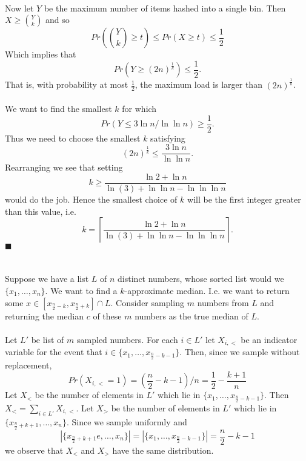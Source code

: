 \documentclass[letterpaper,12pt,oneside,onecolumn]{article}
\newcommand{\ceil}[1]{\ensuremath{\left\lceil#1\right\rceil}}
\begin{document}
\paragraph{}
Now let $Y$ be the maximum number of items hashed into a single bin. Then $X \geq {Y \choose k}$ and so
$$Pr({Y\choose k}\geq t) \leq Pr(X \geq t) \leq \frac{1}{2}$$
Which implies that 
$$Pr(Y \geq (2n)^{\frac{1}{k}}) \leq \frac{1}{2}.$$
That is, with probability at most $\frac{1}{2}$, the maximum load is larger than $(2n)^{\frac{1}{k}}$. 
\paragraph{}
We want to find the smallest $k$ for which 
$$Pr(Y \leq 3\ln n / \ln \ln n) \geq \frac{1}{2}.$$
Thus we need to choose the smallest $k$ satisfying
$$(2n)^{\frac{1}{k}} \leq \frac{3\ln n}{\ln \ln n}.$$
Rearranging we see that setting 
$$k \geq \frac{\ln2 + \ln n}{\ln(3) + \ln\ln n - \ln\ln\ln n}$$
would do the job. Hence the smallest choice of $k$ will be the first integer greater than this value, i.e.
$$k = \ceil{\frac{\ln2 + \ln n}{\ln(3) + \ln\ln n - \ln\ln\ln n}}.$$
$\blacksquare$
\newpage
\section{}
\paragraph{}
Suppose we have a list $L$ of $n$ distinct numbers, whose sorted list would we $\{x_1,\dots, x_n\}$. We want to find a $k$-approximate median. I.e. we want to return some $x \in [x_{\frac{n}{2} - k}, x_{\frac{n}{2} + k}]\cap L$. Consider sampling $m$ numbers from $L$ and returning the median $c$ of these $m$ numbers as the true median of $L$.
\paragraph{}
Let $L'$ be list of $m$ sampled numbers. For each $i \in L'$ let $X_{i,<}$ be an indicator variable for the event that $i \in \{x_1, \dots, x_{\frac{n}{2} -k -1}\}$. Then, since we sample without replacement,
$$Pr(X_{i, <} =1) = (\frac{n}{2} -k -1) / n = \frac{1}{2} - \frac{k+1}{n}$$
Let $X_<$ be the number of elements in $L'$ which lie in $\{x_1, \dots, x_{\frac{n}{2} -k -1}\}$. Then $X_< = \sum_{i \in L'} X_{i,<}$.
Let $X_>$ be the number of elements in $L'$ which lie in $\{x_{\frac{n}{2} + k + 1}, \dots, x_n\}$. Since we sample uniformly and
	$$|\{x_{\frac{n}{2} + k + 1}e, \dots, x_n\}| =  |\{x_1, \dots, x_{\frac{n}{2} -k -1}\}| = \frac{n}{2} - k - 1$$
we observe that $X_<$ and $X_>$ have the same distribution.
\end{document}
